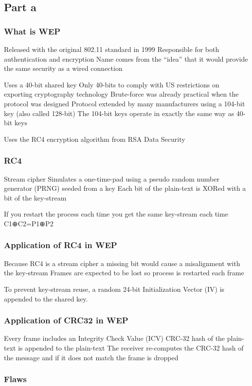 \documentclass[pdftex, 12pt, a4paper]{article}
\begin{document}
\subsection{Part a}
\subsubsection{What is WEP}
Released with the original 802.11 standard in 1999
Responsible for both authentication and encryption
Name comes from the ``idea'' that it would provide the same security as a wired connection

Uses a 40-bit shared key
Only 40-bits to comply with US restrictions on exporting cryptography technology
Brute-force was already practical when the protocol was designed
Protocol extended by many manufacturers using a 104-bit key (also called 128-bit)
The 104-bit keys operate in exactly the same way as 40-bit keys

Uses the RC4 encryption algorithm from RSA Data Security

\subsubsection{RC4}
Stream cipher
Simulates a one-time-pad using a pseudo random number generator (PRNG) seeded from a key
Each bit of the plain-text is XORed with a bit of the key-stream

If you restart the process each time you get the same key-stream each time
C1⊕C2=P1⊕P2

\subsubsection{Application of RC4 in WEP}
Because RC4 is a stream cipher a missing bit would cause a misalignment with the key-stream
Frames are expected to be lost so process is restarted each frame

To prevent key-stream reuse, a random 24-bit Initialization Vector (IV) is appended to the shared key.

\subsubsection{Application of CRC32 in WEP}
Every frame includes an Integrity Check Value (ICV)
CRC-32 hash of the plain-text is appended to the plain-text
The receiver re-computes the CRC-32 hash of the message and if it does not match the frame is dropped

\subsubsection{Flaws}
\end{document}
